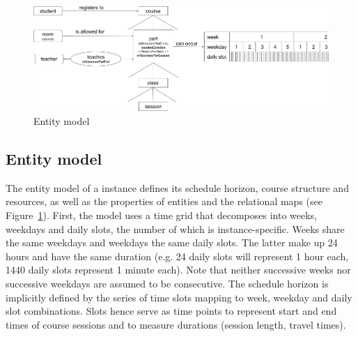 
\begin{figure}[!ht]
\centering
\includegraphics[width=.85\textwidth]{img/utp_entity_model.png}
\caption{Entity model}
\label{fig:utp-entity-model}
\end{figure}

\subsection{Entity model}
\label{sec:entity-model}
The entity model of a {\UTP} instance defines its schedule horizon, course structure and resources, as well as the properties of entities and the relational maps (see Figure~\ref{fig:utp-entity-model}).  
First, the model uses a time grid that decomposes into weeks, weekdays and daily slots, %
the number of which is instance-specific.
Weeks share the same weekdays and weekdays the same daily slots.
The latter make up 24 hours and have the same duration (e.g. 24 daily slots will represent 1 hour each, 1440 daily slots represent 1 minute each).
Note that neither successive weeks nor successive weekdays are assumed to be consecutive.
The schedule horizon is implicitly defined by the series of time slots mapping to week, weekday and daily slot combinations.
Slots hence serve as time points to represent start and end times of course sessions and to measure durations (session length, travel times).



